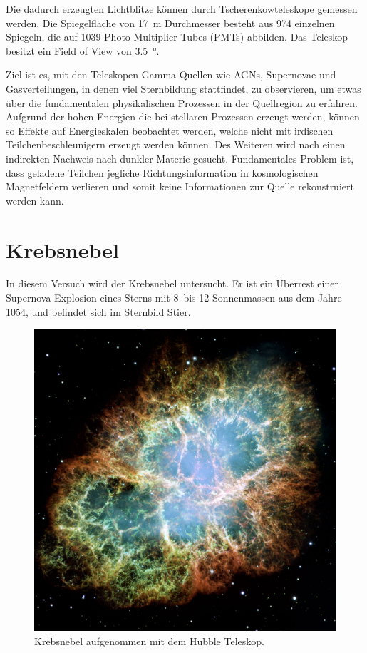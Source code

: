 Die dadurch erzeugten Lichtblitze können durch Tscherenkowteleskope gemessen 
werden.
Die Spiegelfläche von \SI{17}{\meter} Durchmesser besteht aus \num{974} einzelnen
Spiegeln, die auf \num{1039} Photo Multiplier Tubes (PMTs) abbilden.
Das Teleskop besitzt ein Field of View von \SI{3.5}{\degree}.

Ziel ist es, mit den Teleskopen Gamma-Quellen wie AGNs, Supernovae und
Gasverteilungen, in denen viel Sternbildung stattfindet, zu observieren, um etwas
über die fundamentalen physikalischen Prozessen in der Quellregion zu erfahren.
Aufgrund der hohen Energien die bei stellaren Prozessen erzeugt werden, können
so Effekte auf Energieskalen beobachtet werden, welche nicht mit irdischen
Teilchenbeschleunigern erzeugt werden können.
Des Weiteren wird nach einen indirekten Nachweis nach dunkler Materie gesucht.
Fundamentales Problem ist, dass geladene Teilchen jegliche Richtungsinformation
in kosmologischen Magnetfeldern verlieren und somit keine Informationen zur
Quelle rekonstruiert werden kann.

\section*{Krebsnebel}%
\label{sec:krebsnebel}

In diesem Versuch wird der Krebsnebel untersucht.
Er ist ein Überrest einer Supernova-Explosion eines Sterns
mit 8~bis 12 Sonnenmassen aus dem Jahre 1054,
und befindet sich im Sternbild Stier.

\begin{figure}
		\includegraphics[width=\linewidth]{pictures/crab.jpg}
		\caption{Krebsnebel aufgenommen mit dem Hubble Teleskop.}%
		\label{fig:magic}
\end{figure}

